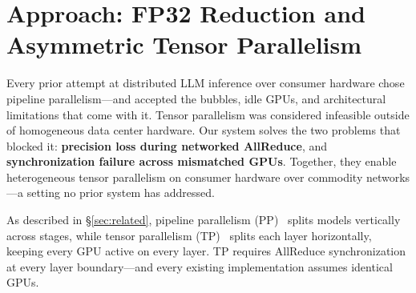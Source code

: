 \documentclass[10pt,twocolumn]{article}
\begin{document}
\section{Approach: FP32 Reduction and Asymmetric Tensor Parallelism}\label{sec:approach}

Every prior attempt at distributed LLM inference over consumer hardware
chose pipeline parallelism---and accepted the bubbles, idle GPUs, and
architectural limitations that come with it.  Tensor parallelism was
considered infeasible outside of homogeneous data center hardware.  Our
system solves the two problems that blocked it: \textbf{precision loss
during networked AllReduce}, and \textbf{synchronization failure across
mismatched GPUs}.  Together, they enable heterogeneous tensor parallelism
on consumer hardware over commodity networks---a setting no prior system
has addressed.

As described in \S\ref{sec:related}, pipeline parallelism
(PP)~\citep{huang2019gpipe} splits models vertically across stages, while
tensor parallelism (TP)~\citep{shoeybi2019megatron} splits each layer
horizontally, keeping every GPU active on every layer.  TP requires
AllReduce synchronization at every layer boundary---and every existing
implementation assumes identical GPUs.
\end{document}
